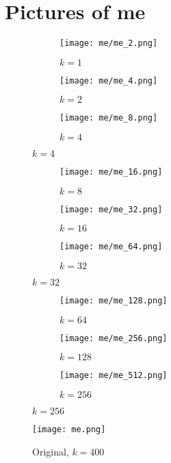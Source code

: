 \documentclass{article}
\begin{document}
\section{Pictures of me}
\begin{figure}[H]
  \begin{subfigure}{.32\textwidth}
    \centering
    \texttt{[image: me/me\_2.png]}
    \caption{$k=1$}
  \end{subfigure}
  \begin{subfigure}{.32\textwidth}
    \centering
    \texttt{[image: me/me\_4.png]}
    \caption{$k=2$}
  \end{subfigure}
  \begin{subfigure}{.32\textwidth}
    \centering
    \texttt{[image: me/me\_8.png]}
    \caption{$k=4$}
  \end{subfigure}
\end{figure}
\begin{figure}[H]
  \begin{subfigure}{.32\textwidth}
    \centering
    \texttt{[image: me/me\_16.png]}
    \caption{$k=8$}
  \end{subfigure}
  \begin{subfigure}{.32\textwidth}
    \centering
    \texttt{[image: me/me\_32.png]}
    \caption{$k=16$}
  \end{subfigure}
  \begin{subfigure}{.32\textwidth}
    \centering
    \texttt{[image: me/me\_64.png]}
    \caption{$k=32$}
  \end{subfigure}
\end{figure}
\begin{figure}[H]
  \begin{subfigure}{.32\textwidth}
    \centering
    \texttt{[image: me/me\_128.png]}
    \caption{$k=64$}
  \end{subfigure}
  \begin{subfigure}{.32\textwidth}
    \centering
    \texttt{[image: me/me\_256.png]}
    \caption{$k=128$}
  \end{subfigure}
  \begin{subfigure}{.32\textwidth}
    \centering
    \texttt{[image: me/me\_512.png]}
    \caption{$k=256$}
  \end{subfigure}
\end{figure}
\begin{figure}[H]
  \centering
  \texttt{[image: me.png]}
  \caption{Original, $k=400$}
\end{figure}
\clearpage
\end{document}
